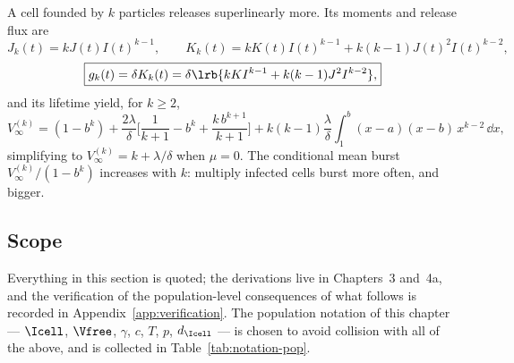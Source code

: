 A cell founded by $k$ particles releases superlinearly more. Its moments
and release flux are
\begin{equation}
J_k(t)=kJ(t)I(t)^{k-1},\qquad
K_k(t)=kK(t)I(t)^{k-1}+k(k-1)J(t)^2I(t)^{k-2},
\end{equation}
\begin{equation}
\boxed{g_k(t)=\delta K_k(t)
=\delta\lrb{kK I^{k-1}+k(k-1)J^2I^{k-2}},}
\label{eq:gk}
\end{equation}
and its lifetime yield, for $k\ge2$,
\begin{equation}
\boxed{V_\infty^{(k)}
=(1-b^k)
+\frac{2\lambda}{\delta}\Biggl[\frac{1}{k+1}-b^k+\frac{k\,b^{k+1}}{k+1}\Biggr]
+k(k-1)\frac{\lambda}{\delta}\int_1^b (x-a)(x-b)\,x^{k-2}\,\dd x,}
\label{eq:Vk}
\end{equation}
simplifying to $V_\infty^{(k)}=k+\lambda/\delta$ when $\mu=0$. The
conditional mean burst $V_\infty^{(k)}/(1-b^k)$ increases with $k$:
multiply infected cells burst more often, and bigger.

\subsection*{Scope}

Everything in this section is quoted; the derivations live in Chapters~3
and~4a, and the verification of the population-level consequences of what
follows is recorded in Appendix~\ref{app:verification}. The population
notation of this chapter --- $\Icell$, $\Vfree$, $\gamma$, $c$, $T$,
$p$, $d_{\Icell}$ --- is chosen to avoid collision with all of the above,
and is collected in Table~\ref{tab:notation-pop}.

